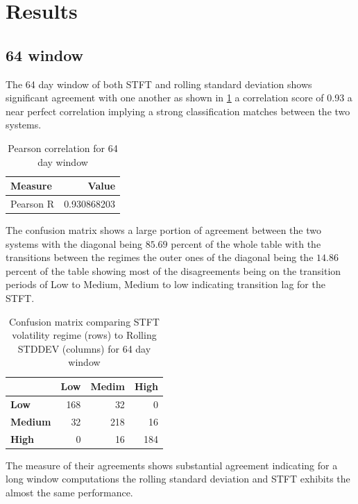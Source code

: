 \documentclass[12pt,letterpaper]{article}
\begin{document}
	\section{Results}
		\subsection{64  window}
			The 64 day window of both STFT and rolling standard deviation shows significant agreement with one another as shown in \ref{tab:correlation_64day} a correlation score of 0.93 a near perfect correlation implying a strong classification matches between the two systems.
			
			\begin{table}[htbp]
				\centering
				\caption{Pearson correlation for 64 day window}
				\label{tab:correlation_64day}
				\begin{tabular}{@{}lr@{}}
					\hline
					\textbf{Measure} & \textbf{Value} \\
					\hline
					Pearson R & 0.930868203 \\
					\hline
				\end{tabular}
			\end{table}
			
			The confusion matrix shows a large portion of agreement between the two systems with the diagonal being $85.69$ percent of the whole table with the transitions between the regimes the outer ones of the diagonal being the $14.86$ percent of the table showing most of the disagreements being on the transition periods of Low to Medium, Medium to low indicating transition lag for the STFT.
			
			\begin{table}[htbp]
				\centering
				\caption{Confusion matrix comparing STFT volatility regime (rows) to Rolling STDDEV (columns) for 64 day window}
				\label{tab:confusion_64day}
				\begin{tabular}{@{}l r r r@{}}
					\hline
					& \textbf{Low} & \textbf{Medim} & \textbf{High} \\
					\hline
					\textbf{Low}    & 168 & 32  & 0   \\
					\textbf{Medium} & 32  & 218 & 16  \\
					\textbf{High}   & 0   & 16  & 184 \\
					\hline
				\end{tabular}
			\end{table}
			
			The measure of their agreements shows substantial agreement indicating for a long window computations the rolling standard deviation and STFT exhibits the almost the same performance.
			
\end{document}
